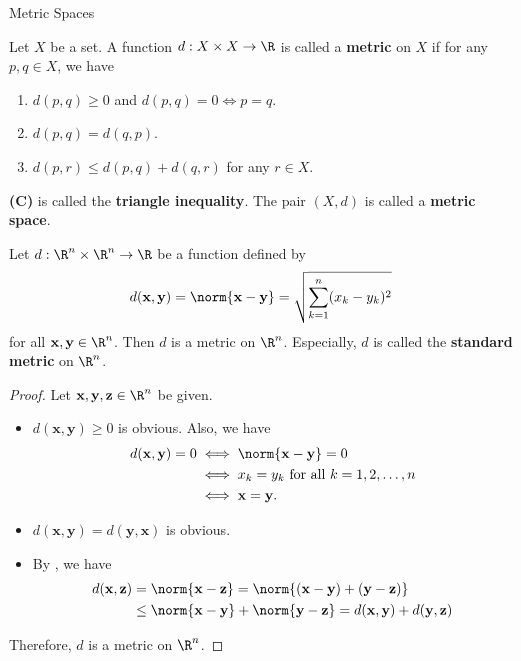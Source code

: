 \begin{section}{Metric Spaces}

Let $X$ be a set. A function $d: X \times X \to \R$ is called a \textbf{metric} on $X$ if for any $p, q \in X$, we have
\begin{enumerate}[label=\textbf{(\Alph*)}]
    \item $d(p, q) \geq 0$ and $d(p, q) = 0 \iff p = q$.
    \item $d(p, q) = d(q, p)$.
    \item $d(p, r) \leq d(p, q) + d(q, r)$ for any $r \in X$.
\end{enumerate}
\textbf{(C)} is called the \textbf{triangle inequality}. The pair $(X, d)$ is called a \textbf{metric space}.

\bigskip

\begin{theorem} \label{thm:StandardMetricOnRn}
    Let $d: \R^{n} \times \R^{n} \to \R$ be a function defined by
    \[
    d(\mathbf{x}, \mathbf{y}) = \norm{\mathbf{x} - \mathbf{y}} = \sqrt{\sum_{k = 1}^{n} (x_{k} - y_{k})^{2}}
    \]
    for all $\mathbf{x}, \mathbf{y} \in \R^{n}$. Then $d$ is a metric on $\R^{n}$.
    Especially, $d$ is called the \textbf{standard metric} on $\R^{n}$.
\end{theorem}

\begin{proof}
    Let $\mathbf{x}, \mathbf{y}, \mathbf{z} \in \R^{n}$ be given.
    \begin{itemize}
        \item $d(\mathbf{x}, \mathbf{y}) \geq 0$ is obvious. Also, we have
        \begin{align*}
            d(\mathbf{x}, \mathbf{y}) = 0 &\iff \norm{\mathbf{x} - \mathbf{y}} = 0 \\
            &\iff x_{k} = y_{k} \text{ for all } k = 1, 2, \dots, n \\
            &\iff \mathbf{x} = \mathbf{y}.
        \end{align*}
        \item $d(\mathbf{x}, \mathbf{y}) = d(\mathbf{y}, \mathbf{x})$ is obvious.
        \item By , we have
        \begin{align*}
            d(\mathbf{x}, \mathbf{z}) &= \norm{\mathbf{x} - \mathbf{z}} =
            \norm{(\mathbf{x} - \mathbf{y}) + (\mathbf{y} - \mathbf{z})} \\
            &\leq \norm{\mathbf{x} - \mathbf{y}} + \norm{\mathbf{y} - \mathbf{z}}
            = d(\mathbf{x},\mathbf{y}) + d(\mathbf{y},\mathbf{z})
        \end{align*}
    \end{itemize}
    Therefore, $d$ is a metric on $\R^{n}$.
\end{proof}


\end{section}
